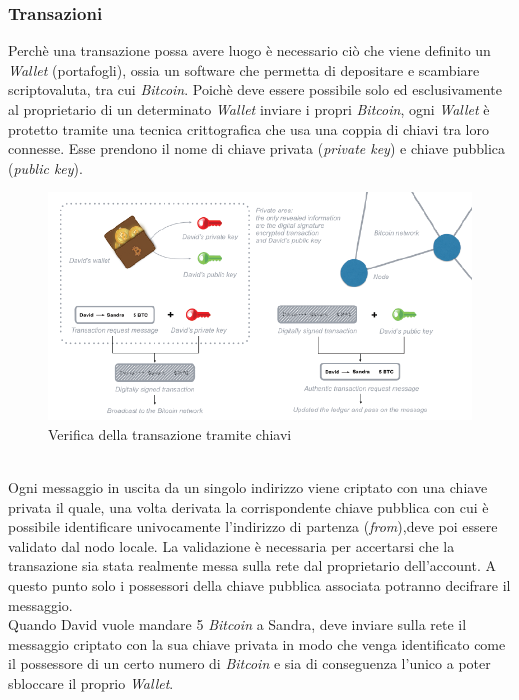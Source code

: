\documentclass[11pt]{thesistemp}
\begin{document}
\subsubsection{Transazioni}
Perchè una transazione possa avere luogo è necessario ciò che viene definito un \textit{Wallet} (portafogli), ossia un software che permetta di depositare e scambiare scriptovaluta, tra cui \textit{Bitcoin}.
Poichè deve essere possibile solo ed esclusivamente al proprietario di un determinato \textit{Wallet} inviare i propri \textit{Bitcoin}, ogni \textit{Wallet} è protetto tramite una tecnica crittografica che usa una coppia di chiavi tra loro connesse.
Esse prendono il nome di chiave privata (\textit{private key}) e chiave pubblica (\textit{public key}).
\begin{figure}[h]\hfill
    \centering
    \includegraphics[width=\textwidth]{public-private-keys.png}
    \caption{Verifica della transazione tramite chiavi}
    \label{fig:pkey}
\end{figure}\\
Ogni messaggio in uscita da un singolo indirizzo viene criptato con una chiave privata il quale, una volta derivata la corrispondente chiave pubblica con cui è possibile identificare univocamente l'indirizzo di partenza (\textit{from}),deve poi essere validato dal nodo locale.
La validazione è necessaria per accertarsi che la transazione sia stata realmente messa sulla rete dal proprietario dell'account.
A questo punto solo i possessori della chiave pubblica associata potranno decifrare il messaggio.\\
Quando David vuole mandare 5 \textit{Bitcoin} a Sandra, deve inviare sulla rete il messaggio criptato con la sua chiave privata in modo che venga identificato come il possessore di un certo numero di \textit{Bitcoin} e sia di conseguenza l’unico a poter sbloccare il proprio \textit{Wallet}.
\end{document}
